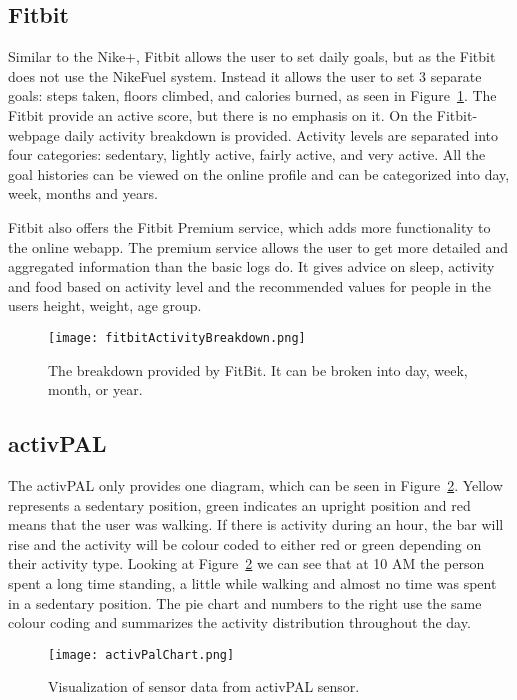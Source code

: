 \subsection{Fitbit}
Similar to the Nike+, Fitbit \cite{fitBit} allows the user to set daily goals, but as the Fitbit does not use the NikeFuel system. Instead it allows the user to set 3 separate goals: steps taken, floors climbed, and calories burned, as seen in Figure~\ref{fig:fitbitActivityBreakdown}. The Fitbit provide an active score, but there is no emphasis on it. On the Fitbit-webpage daily activity breakdown is provided. Activity levels are separated into four categories: sedentary, lightly active, fairly active, and very active. All the goal histories can be viewed on the online profile and can be categorized into day, week, months and years. 

Fitbit also offers the Fitbit Premium service, which adds more functionality to the online webapp. The premium service allows the user to get more detailed and aggregated information than the basic logs do. It gives advice on sleep, activity and food based on activity level and the recommended values for people in the users height, weight, age group.

\begin{figure}[h!]
	\centering
		\texttt{[image: fitbitActivityBreakdown.png]}
		\caption{\footnotesize The breakdown provided by FitBit. It can be broken into day, week, month, or year.}
		\label{fig:fitbitActivityBreakdown}
\end{figure}

\subsection{activPAL}
\label{sec:activPALViz}
The activPAL only provides one diagram, which can be seen in Figure~\ref{fig:activPalActivityBreakdown}. Yellow represents a sedentary position, green indicates an upright position and red means that the user was walking. If there is activity during an hour, the bar will rise and the activity will be colour coded to either red or green depending on their activity type. Looking at Figure~\ref{fig:activPalActivityBreakdown} we can see that at 10 AM the person spent a long time standing, a little while walking and almost no time was spent in a sedentary position. The pie chart and numbers to the right use the same colour coding and summarizes the activity distribution throughout the day.

\begin{figure}[h!]
	\centering
		\texttt{[image: activPalChart.png]}
		\caption{\footnotesize Visualization of sensor data from activPAL sensor.}
		\label{fig:activPalActivityBreakdown}
\end{figure}
